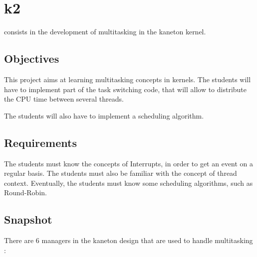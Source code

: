 %
%
%
%
%
%

%
%

\chapter{k2}
\label{chapter:k2}

 consists in the development of multitasking in the kaneton kernel.

\newpage

%
%

%
%

\section{Objectives}

This project aims at learning multitasking concepts in kernels. The students will have to implement part of the task switching code, that will allow to distribute the CPU time between several threads.

The students will also have to implement a scheduling algorithm.

%
%

\section{Requirements}

The students must know the concepts of Interrupts, in order to get an event on a regular basis. The students must also be familiar with the concept of thread context. Eventually, the students must know some scheduling algorithms, such as Round-Robin.

%
%

\section{Snapshot}

There are 6 managers in the kaneton design that are used to handle multitasking :

